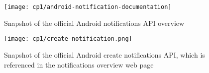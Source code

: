 \clearpage


\begin{landscape}
\begin{figure}
    \centering
    \texttt{[image: cp1/android-notification-documentation]}
    \caption{Snapshot of the official Android notifications API overview}
    \label{fig:android-notifications-api-page}
\end{figure}
\end{landscape}


\clearpage


\begin{landscape}
\begin{figure}
    \centering
    \texttt{[image: cp1/create-notification.png]}
    \caption{Snapshot of the official Android create notifications API, which is referenced in the notifications overview web page}
    \label{fig:android-create-notification}
\end{figure}
\end{landscape}
